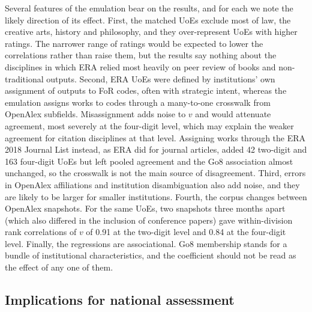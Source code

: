 Several features of the emulation bear on the results, and for each we note the likely direction of its effect. First, the matched UoEs exclude most of law, the creative arts, history and philosophy, and they over-represent UoEs with higher ratings. The narrower range of ratings would be expected to lower the correlations rather than raise them, but the results say nothing about the disciplines in which ERA relied most heavily on peer review of books and non-traditional outputs. Second, ERA UoEs were defined by institutions' own assignment of outputs to FoR codes, often with strategic intent, whereas the emulation assigns works to codes through a many-to-one crosswalk from OpenAlex subfields. Misassignment adds noise to $v$ and would attenuate agreement, most severely at the four-digit level, which may explain the weaker agreement for citation disciplines at that level. Assigning works through the ERA 2018 Journal List instead, as ERA did for journal articles, added 42 two-digit and 163 four-digit UoEs but left pooled agreement and the Go8 association almost unchanged, so the crosswalk is not the main source of disagreement. Third, errors in OpenAlex affiliations and institution disambiguation also add noise, and they are likely to be larger for smaller institutions. Fourth, the corpus changes between OpenAlex snapshots. For the same UoEs, two snapshots three months apart (which also differed in the inclusion of conference papers) gave within-division rank correlations of $v$ of 0.91 at the two-digit level and 0.84 at the four-digit level. Finally, the regressions are associational. Go8 membership stands for a bundle of institutional characteristics, and the coefficient should not be read as the effect of any one of them.

\subsection{Implications for national assessment}


